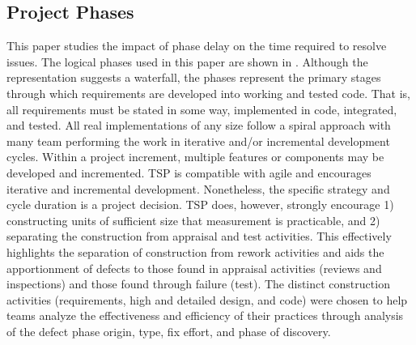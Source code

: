  

\subsection{Project Phases}
This paper studies the impact of phase delay on the time required to resolve issues.
The logical phases used in this paper are shown in . Although the representation suggests a waterfall, the phases represent the primary stages through which requirements are developed into working and tested code. That is, all requirements must be stated in some way, implemented in code, integrated, and tested. All real implementations of any size follow a spiral approach with many team performing the work in iterative and/or incremental development cycles.  Within a project increment, multiple features or components may be developed and incremented. TSP is compatible with agile and encourages iterative and incremental development. Nonetheless, the specific strategy and cycle duration is a project decision. TSP does, however, strongly encourage 1) constructing units of sufficient size that measurement is practicable, and 2) separating the construction from appraisal and test activities. This effectively highlights the separation of construction from rework activities and aids the apportionment of defects to those found in appraisal activities (reviews and inspections) and those found through failure (test). The distinct construction activities (requirements, high and detailed design, and code) were chosen to help teams analyze the effectiveness and efficiency of their practices through analysis of the defect phase origin, type, fix effort, and phase of discovery. 


